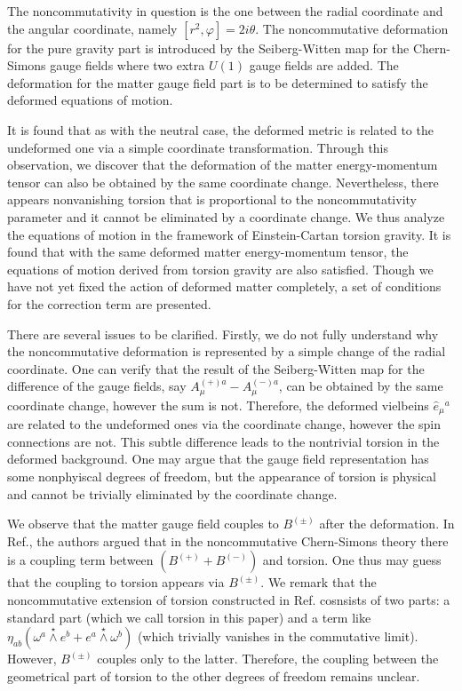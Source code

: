 \documentclass[11pt]{article}
\newcommand{\vap}{\varphi}
\numberwithin{equation}{section}
\newcommand{\swedge}{\stackrel{\star}{\wedge}}
\begin{document}
The noncommutativity in question is the one between the radial coordinate and the angular coordinate, namely $[r^2 , \vap]=2i\theta$.
The noncommutative deformation for the pure gravity part is introduced by the Seiberg-Witten map
for the Chern-Simons gauge fields where two extra $U(1)$ gauge fields are added.
The deformation for the matter gauge field part is to be determined to satisfy the deformed equations of motion.

It is found that as with the neutral case, the deformed metric 
is related to the undeformed one via a simple coordinate transformation.
Through this observation, we discover that the deformation of 
the matter energy-momentum tensor can also be obtained by the same coordinate change.
Nevertheless, there appears nonvanishing torsion that is proportional to the noncommutativity parameter and 
it cannot be eliminated by a coordinate change. 
We thus analyze the equations of motion in the framework of Einstein-Cartan torsion gravity.
It is found that with the same deformed matter energy-momentum tensor, the equations of motion
derived from torsion gravity are also satisfied.
Though we have not yet fixed the action of deformed matter completely, a set of conditions
for the correction term are presented.


There are several issues to be clarified.
Firstly, we do not fully understand why the noncommutative deformation is represented by a simple change of 
the radial coordinate.
One can verify that the result of the Seiberg-Witten map for the difference of the gauge fields, say 
$A_\mu^{(+)a}-A_\mu^{(-)a}$, can be obtained by the same coordinate change, however the sum is not.
Therefore, the deformed vielbeins $\hat{e}_\mu{}^a$ are related to the undeformed ones via the coordinate change,
however the spin connections are not.
This subtle difference leads to the nontrivial torsion in the deformed background.
One may argue that the gauge field representation has some nonphyiscal degrees of freedom, but the appearance of torsion is
physical and cannot be trivially eliminated by the coordinate change.

We observe that the matter gauge field couples to $B^{(\pm)}$ after the deformation.
In Ref.\cite{Cacciatori:2002gq}, the authors argued that in the noncommutative
Chern-Simons theory there is a coupling term between $(B^{(+)}+B^{(-)})$
and torsion.  One thus may guess that the coupling to torsion appears via
$B^{(\pm)}$.  We remark that the noncommutative extension of
torsion constructed in Ref.\cite{Cacciatori:2002gq} cosnsists of two parts: a standard part (which we call torsion
in this paper) and a term like $\eta_{ab}(\omega^a \swedge e^b + e^a \swedge
\omega^b)$ (which trivially vanishes in the commutative limit).  However, $B^{(\pm)}$ couples only to the latter.
Therefore, the coupling between the geometrical part of torsion to the other
degrees of freedom remains unclear.
\end{document}
